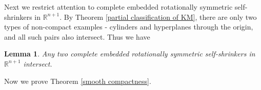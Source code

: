 \documentclass[12pt]{amsart}
\numberwithin{equation}{section}
\newtheorem{lem}[thm]{Lemma}
\theoremstyle{remark}
\begin{document}
	
	Next we restrict attention to complete embedded rotationally symmetric self-shrinkers in $\mathbb R^{n+1}$. By Theorem \ref{partial classification of KM}, there are only two types of non-compact examples - cylinders and hyperplanes through the origin, and all such pairs also intersect. Thus we have 
	
	\begin{lem} \label{all tori intersect}
		Any two complete embedded rotationally symmetric self-shrinkers in $\mathbb R^{n+1}$ intersect.
	\end{lem}
	
	Now we prove Theorem \ref{smooth compactness}.
	
\end{document}

